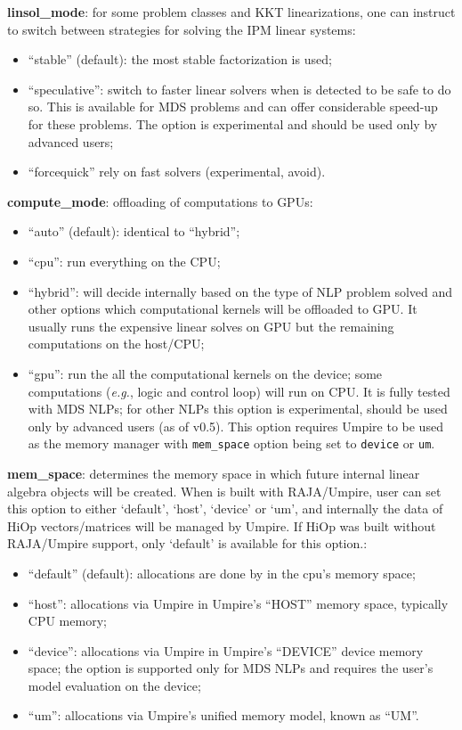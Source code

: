 \noindent \textbf{linsol\_mode}: for some problem classes and KKT linearizations, one can instruct \Hi to switch between strategies for solving the IPM linear systems:
\begin{itemize}
\item ``stable'' (default): the most stable factorization is used;
\item ``speculative'': switch to faster linear solvers when is detected to be safe to do so. This is available for MDS problems and can offer considerable speed-up for these problems. The option is experimental and should be used only by advanced users;
\item ``forcequick'' rely on fast solvers (experimental, avoid).
\end{itemize}
\medskip

\noindent \textbf{compute\_mode}: offloading of computations to GPUs:
\begin{itemize}
\item ``auto'' (default): identical to ``hybrid'';
\item ``cpu'': run everything on the CPU;
\item ``hybrid'':  \Hi will decide internally based on the type of NLP problem solved and other options which computational kernels will be offloaded to GPU. It usually runs the expensive linear solves on GPU but the remaining computations on the host/CPU;
\item ``gpu'': run the all the computational kernels on the device; some computations (\textit{e.g.}, logic and control loop) will run on CPU. It is fully tested with MDS NLPs; for other NLPs this option is experimental, should be used only by advanced users (as of v0.5). This option requires Umpire to be used as the memory manager with \texttt{mem\_space} option being set to \texttt{device} or \texttt{um}.
\end{itemize}
\medskip

\noindent \textbf{mem\_space}: determines the memory space in which future internal linear algebra objects will be created. When \Hi is built with RAJA/Umpire, user can set this option to either `default', `host', `device' or `um', and internally the data of HiOp vectors/matrices will be managed by Umpire. If HiOp was built without RAJA/Umpire support, only `default' is available for this option.:
\begin{itemize}
\item ``default'' (default): allocations are done by \Hi in the cpu's memory space;
\item ``host'':  allocations via Umpire in Umpire's ``HOST'' memory space, typically CPU memory;
\item ``device'': allocations via Umpire in Umpire's ``DEVICE'' device memory space; the option is supported only for MDS NLPs and requires the user's model evaluation on the device;
\item ``um'': allocations via Umpire's unified memory model, known as ``UM''.
\end{itemize}
\medskip

